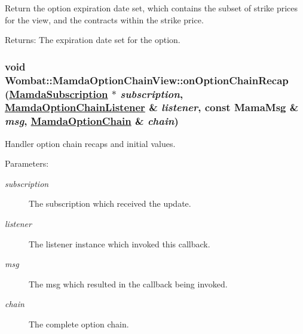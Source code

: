Return the option expiration date set, which contains the subset of strike prices for the view, and the contracts within the strike price. 

\begin{Desc}
\item[Returns:]The expiration date set for the option. \end{Desc}
\hypertarget{classWombat_1_1MamdaOptionChainView_462b2193ed1b852f15859742008dd5b7}{
\subsubsection[onOptionChainRecap]{\setlength{\rightskip}{0pt plus 5cm}void Wombat::Mamda\-Option\-Chain\-View::on\-Option\-Chain\-Recap (\hyperlink{classWombat_1_1MamdaSubscription}{Mamda\-Subscription} $\ast$ {\em subscription}, \hyperlink{classWombat_1_1MamdaOptionChainListener}{Mamda\-Option\-Chain\-Listener} \& {\em listener}, const Mama\-Msg \& {\em msg}, \hyperlink{classWombat_1_1MamdaOptionChain}{Mamda\-Option\-Chain} \& {\em chain})}}
\label{classWombat_1_1MamdaOptionChainView_462b2193ed1b852f15859742008dd5b7}


Handler option chain recaps and initial values. 

\begin{Desc}
\item[Parameters:]
\begin{description}
\item[{\em subscription}]The subscription which received the update. \item[{\em listener}]The listener instance which invoked this callback. \item[{\em msg}]The msg which resulted in the callback being invoked. \item[{\em chain}]The complete option chain. \end{description}
\end{Desc}


